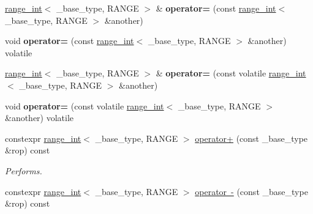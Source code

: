 \begin{DoxyCompactItemize}
\mbox{\label{classfsl_1_1lg_1_1range__int_a1356dae4f80c8c2e3b0118320a1e9dcf}} 
\mbox{\hyperlink{classfsl_1_1lg_1_1range__int}{range\+\_\+int}}$<$ \+\_\+base\+\_\+type, R\+A\+N\+GE $>$ \& {\bfseries operator=} (const \mbox{\hyperlink{classfsl_1_1lg_1_1range__int}{range\+\_\+int}}$<$ \+\_\+base\+\_\+type, R\+A\+N\+GE $>$ \&another)
\item 
\mbox{\label{classfsl_1_1lg_1_1range__int_a12cbcfc3989c4a4211e5ee9e4f6dc057}} 
void {\bfseries operator=} (const \mbox{\hyperlink{classfsl_1_1lg_1_1range__int}{range\+\_\+int}}$<$ \+\_\+base\+\_\+type, R\+A\+N\+GE $>$ \&another) volatile
\item 
\mbox{\label{classfsl_1_1lg_1_1range__int_ad68b8d722621d6e1eb0f18e86abf67b4}} 
\mbox{\hyperlink{classfsl_1_1lg_1_1range__int}{range\+\_\+int}}$<$ \+\_\+base\+\_\+type, R\+A\+N\+GE $>$ \& {\bfseries operator=} (const volatile \mbox{\hyperlink{classfsl_1_1lg_1_1range__int}{range\+\_\+int}}$<$ \+\_\+base\+\_\+type, R\+A\+N\+GE $>$ \&another)
\item 
\mbox{\label{classfsl_1_1lg_1_1range__int_aae783349cffc3aaa08c0ce9cc38e60a4}} 
void {\bfseries operator=} (const volatile \mbox{\hyperlink{classfsl_1_1lg_1_1range__int}{range\+\_\+int}}$<$ \+\_\+base\+\_\+type, R\+A\+N\+GE $>$ \&another) volatile
\item 
\mbox{\label{classfsl_1_1lg_1_1range__int_ae36516b64216806a57986fcedaa07d63}} 
constexpr \mbox{\hyperlink{classfsl_1_1lg_1_1range__int}{range\+\_\+int}}$<$ \+\_\+base\+\_\+type, R\+A\+N\+GE $>$ \mbox{\hyperlink{classfsl_1_1lg_1_1range__int_ae36516b64216806a57986fcedaa07d63}{operator+}} (const \+\_\+base\+\_\+type \&rop) const
\begin{DoxyCompactList}\small\item\em Performs. \end{DoxyCompactList}\item 
\mbox{\label{classfsl_1_1lg_1_1range__int_a0cc2becff969f7e51756aa0b1ed478a6}} 
constexpr \mbox{\hyperlink{classfsl_1_1lg_1_1range__int}{range\+\_\+int}}$<$ \+\_\+base\+\_\+type, R\+A\+N\+GE $>$ \mbox{\hyperlink{classfsl_1_1lg_1_1range__int_a0cc2becff969f7e51756aa0b1ed478a6}{operator -\/}} (const \+\_\+base\+\_\+type \&rop) const

\end{DoxyCompactItemize}
